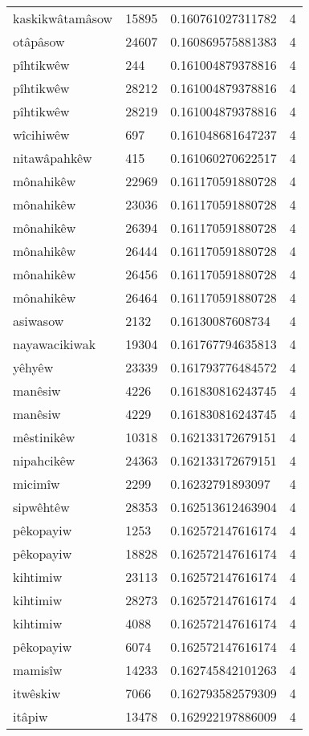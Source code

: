 \begin{longtable}{llll}
kaskikwâtamâsow & 15895 & 0.160761027311782 & 4 \\
otâpâsow & 24607 & 0.160869575881383 & 4 \\
pîhtikwêw & 244 & 0.161004879378816 & 4 \\
pîhtikwêw & 28212 & 0.161004879378816 & 4 \\
pîhtikwêw & 28219 & 0.161004879378816 & 4 \\
wîcihiwêw & 697 & 0.161048681647237 & 4 \\
nitawâpahkêw & 415 & 0.161060270622517 & 4 \\
mônahikêw & 22969 & 0.161170591880728 & 4 \\
mônahikêw & 23036 & 0.161170591880728 & 4 \\
mônahikêw & 26394 & 0.161170591880728 & 4 \\
mônahikêw & 26444 & 0.161170591880728 & 4 \\
mônahikêw & 26456 & 0.161170591880728 & 4 \\
mônahikêw & 26464 & 0.161170591880728 & 4 \\
asiwasow & 2132 & 0.16130087608734 & 4 \\
nayawacikiwak & 19304 & 0.161767794635813 & 4 \\
yêhyêw & 23339 & 0.161793776484572 & 4 \\
manêsiw & 4226 & 0.161830816243745 & 4 \\
manêsiw & 4229 & 0.161830816243745 & 4 \\
mêstinikêw & 10318 & 0.162133172679151 & 4 \\
nipahcikêw & 24363 & 0.162133172679151 & 4 \\
micimîw & 2299 & 0.16232791893097 & 4 \\
sipwêhtêw & 28353 & 0.162513612463904 & 4 \\
pêkopayiw & 1253 & 0.162572147616174 & 4 \\
pêkopayiw & 18828 & 0.162572147616174 & 4 \\
kihtimiw & 23113 & 0.162572147616174 & 4 \\
kihtimiw & 28273 & 0.162572147616174 & 4 \\
kihtimiw & 4088 & 0.162572147616174 & 4 \\
pêkopayiw & 6074 & 0.162572147616174 & 4 \\
mamisîw & 14233 & 0.162745842101263 & 4 \\
itwêskiw & 7066 & 0.162793582579309 & 4 \\
itâpiw & 13478 & 0.162922197886009 & 4 \\

\end{longtable}

